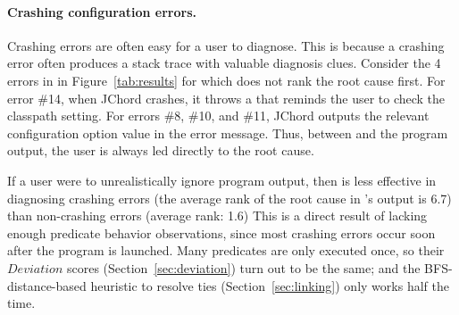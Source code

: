 
\paragraph{Crashing configuration errors.}

Crashing errors are often easy for a user to diagnose.
This is because a crashing error often produces a stack trace with valuable diagnosis clues.
Consider the 4 errors in in Figure~\ref{tab:results} for which \ourtool
does not rank the root cause first.
For error \#14, when JChord crashes, it throws a 
that reminds the user to check the classpath setting.  For errors \#8,
\#10, and \#11, 
JChord outputs the relevant configuration option value in the
error message.  Thus, between \ourtool and the program output, the user is
always led directly to the root cause.

If a user were to unrealistically ignore program output, then \ourtool is less effective
in diagnosing crashing errors (the average rank of the root cause
in \ourtool's output is 6.7) than non-crashing errors (average rank: 1.6)
This is a direct result of lacking enough predicate behavior observations,
since most crashing errors occur soon
after the program is launched.  Many predicates are
only executed once, so their $Deviation$ scores
 (Section~\ref{sec:deviation}) turn out to be the same; and the
 BFS-distance-based heuristic to resolve ties (Section~\ref{sec:linking}) only
works half the time.













